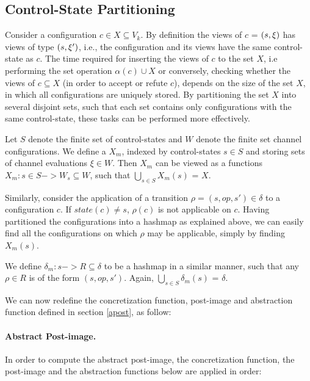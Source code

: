 \subsection{Control-State Partitioning}
Consider a configuration $c \in X \subseteq V_k$. By definition the views of $c$ = $(s, \xi)$ has views of type $(s,\xi')$, i.e., the configuration and its views have the same control-state as $c$. The time required for inserting the views of $c$ to the set $X$, i.e performing the set operation $\alpha(c) \cup X$ or conversely, checking whether the views of $c \subseteq X$ (in order to accept or refute $c$), depends on the size of the set $X$, in which all configurations are uniquely stored. By partitioning the set $X$ into several disjoint sets, such that each set contains only configurations with the same control-state, these tasks can be performed more effectively.

Let $S$ denote the finite set of control-states and $W$ denote the finite set channel configurations. We define a  $X_m$, indexed by control-states $s \in S$ and storing sets of channel evaluations $\xi \in W$. Then $X_m$ can be viewed as a functions $X_m : s \in S -> W_s \subseteq W$, such that $\bigcup\limits_{s\in S} X_m(s)$ = $X$.

Similarly, consider the application of a transition $\rho = (s, op, s') \in \delta$ to a configuration $c$. If $state(c) \neq s$, $\rho(c)$ is not applicable on $c$. Having partitioned the configurations into a hashmap as explained above, we can easily find all the configurations on which $\rho$ may be applicable, simply by finding $X_m(s)$.

We define $\delta_m : s -> R \subseteq \delta$ to be a hashmap in a similar manner, such that any $\rho \in R$ is of the form $(s, op, s')$. Again, $\bigcup\limits_{s\in S} \delta_m(s)$ = $\delta$.

We can now redefine the concretization function, post-image and abstraction function defined in section \ref{apost}, as follow:

\paragraph{Abstract Post-image.}
In order to compute the abstract post-image, the concretization function, the post-image and the abstraction functions below are applied in order:

